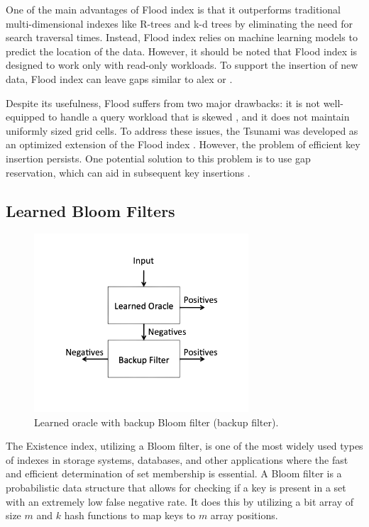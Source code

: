 One of the main advantages of Flood index is that it outperforms traditional multi-dimensional indexes like R-trees and k-d trees by eliminating the need for search traversal times. Instead, Flood index relies on machine learning models to predict the location of the data. However, it should be noted that Flood index is designed to work only with read-only workloads. To support the insertion of new data, Flood index can leave gaps similar to \acrshort{alex} or \btree. 

Despite its usefulness, Flood suffers from two major drawbacks: it is not well-equipped to handle a query workload that is skewed \cite{Tsunami}, and it does not maintain uniformly sized grid cells. To address these issues, the Tsunami was developed as an optimized extension of the Flood index \cite{Tsunami}. However, the problem of efficient key insertion persists. One potential solution to this problem is to use gap reservation, which can aid in subsequent key insertions \cite{FloodLMD}.



\subsection{Learned Bloom Filters}
\begin{figure}
    \centering
    \includegraphics[width=80mm,scale=1]{Figures/learnedBloom.png}
    \caption{
        Learned oracle with backup Bloom filter (backup filter).
    }
    \label{fig:LearnedBloom}
\end{figure}
The Existence index, utilizing a Bloom filter, is one of the most widely used types of indexes in storage systems, databases, and other applications where the fast and efficient determination of set membership is essential. A Bloom filter is a probabilistic data structure that allows for checking if a key is present in a set with an extremely low false negative rate. It does this by utilizing a bit array of size $m$ and $k$ hash functions to map keys to $m$ array positions.

